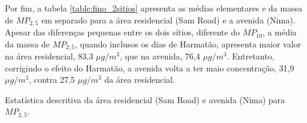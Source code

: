 Por fim, a tabela \ref{table:fino_2sitios} apresenta as médias elementares e
da massa de $MP_{2,5}$ em separado para a área residencial (Sam Road) e
a avenida (Nima). Apesar das diferenças pequenas entre os dois sítios, 
diferente do $MP_{10}$, a média da massa de $MP_{2,5}$, quando inclusos os dias
de Harmatão, apresenta maior valor na área residencial, 83,3 $\mu g / m^3$,
que na avenida, 76,4 $\mu g / m^3$. Entretanto, corrigindo o efeito do Harmatão,
a avenida volta a ter maio concentração, 31,9 $\mu g / m^3$, contra 27,5 
$\mu g / m^3$  da área residencial.

\begin{table}[H]
  \centering
    
  \caption{Estatística descritiva da área residencial (Sam Road) e avenida (Nima) 
           para $MP_{2,5}$. \label{table:fino_2sitios}}
\end{table}

